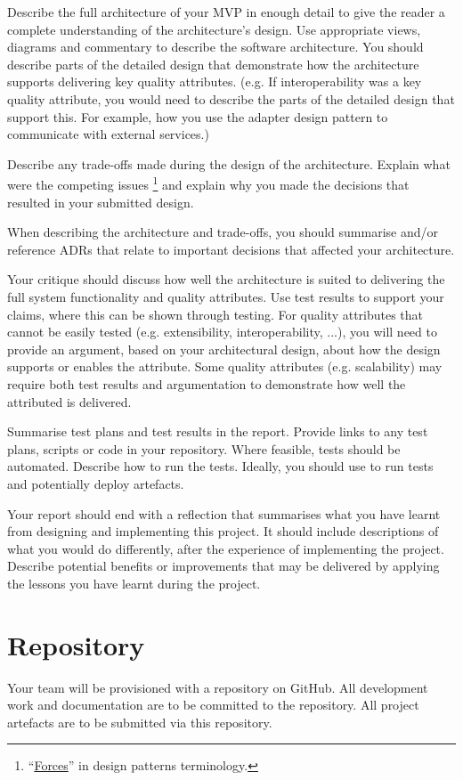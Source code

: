 \documentclass{csse4400}
\begin{document}
Describe the full architecture of your MVP in enough detail
to give the reader a complete understanding of the architecture's design.
Use appropriate views, diagrams and commentary to describe the software architecture.
You should describe parts of the detailed design that demonstrate how the architecture supports delivering key quality attributes.
(e.g. If interoperability was a key quality attribute, you would need to describe the parts of the detailed design that support this.
For example, how you use the adapter design pattern to communicate with external services.)

Describe any trade-offs made during the design of the architecture.
Explain what were the competing issues%
\footnote{``\href{http://www.cs.unc.edu/~stotts/COMP723-s15/patterns/forces.html}{Forces}'' in design patterns terminology.}
and explain why you made the decisions that resulted in your submitted design.

When describing the architecture and trade-offs,
you should summarise and/or reference ADRs that relate to important decisions that affected your architecture.

Your critique should discuss how well the architecture is suited to delivering the full system functionality and quality attributes.
Use test results to support your claims, where this can be shown through testing.
For quality attributes that cannot be easily tested (e.g. extensibility, interoperability, ...),
you will need to provide an argument, based on your architectural design, about how the design supports or enables the attribute.
Some quality attributes (e.g. scalability) may require both test results
and argumentation to demonstrate how well the attributed is delivered.

Summarise test plans and test results in the report.
Provide links to any test plans, scripts or code in your repository.
Where feasible, tests should be automated.
Describe how to run the tests.
Ideally, you should use 
to run tests and potentially deploy artefacts.

Your report should end with a reflection that summarises what you have learnt from designing and implementing this project.
It should include descriptions of what you would do differently, after the experience of implementing the project.
Describe potential benefits or improvements that may be delivered by applying the lessons you have learnt during the project.


\section{Repository}
Your team will be provisioned with a repository on GitHub.
All development work and documentation are to be committed to the repository.
All project artefacts are to be submitted via this repository.
\end{document}

